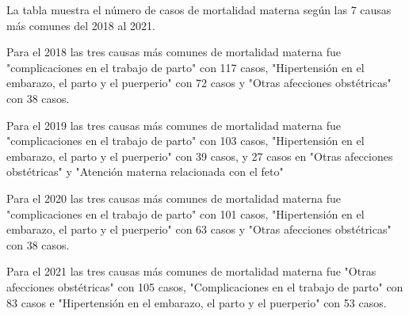 La tabla muestra el número de casos de mortalidad materna según las 7 causas más comunes del 2018 al 2021. 

Para el 2018 las tres causas más comunes de mortalidad materna fue "complicaciones en el trabajo de parto" con 117 casos, "Hipertensión en el embarazo, el parto y el puerperio" con 72 casos y "Otras afecciones obstétricas" con 38 casos. 

Para el 2019 las tres causas más comunes de mortalidad materna fue "complicaciones en el trabajo de parto" con 103 casos, "Hipertensión en el embarazo, el parto y el puerperio" con 39 casos, y 27 casos en "Otras afecciones obstétricas" y "Atención materna relacionada con el feto"

Para el 2020 las tres causas más comunes de mortalidad materna fue "complicaciones en el trabajo de parto" con 101 casos, "Hipertensión en el embarazo, el parto y el puerperio" con 63 casos y "Otras afecciones obstétricas" con 38 casos. 

Para el 2021 las tres causas más comunes de mortalidad materna fue "Otras afecciones obstétricas" con 105 casos, "Complicaciones en el trabajo de parto" con 83 casos e "Hipertensión en el embarazo, el parto y el puerperio" con 53 casos.